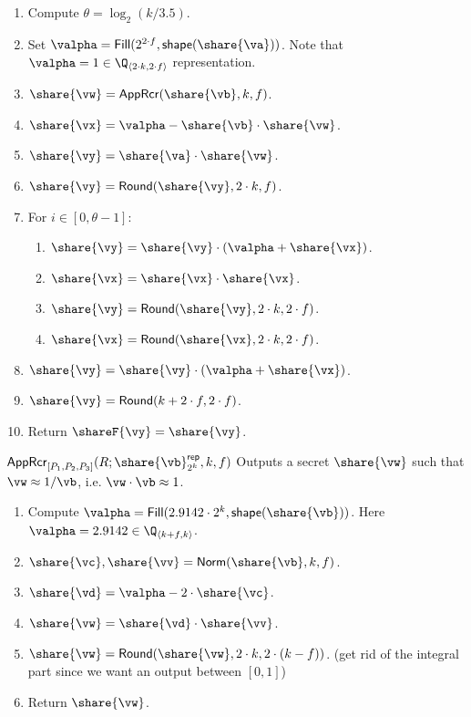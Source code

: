 \begin{enumerate}
    \item Compute $\theta = \log_2({k/3.5})$.
    \item Set $\valpha = \mathsf{Fill}(2^{2\cdot f},\mathsf{shape}(\share{\va}))$. Note that $\valpha = 1 \in \Q_{\langle 2\cdot k, 2\cdot f \rangle}$ representation.
    \item $\share{\vw} = \mathsf{AppRcr}(\share{\vb}, k, f)$.
    \item $\share{\vx} = \valpha - \share{\vb} \cdot \share{\vw}$.
    \item $\share{\vy} = \share{\va} \cdot \share{\vw}$.
    \item $\share{\vy} = \mathsf{Round}(\share{\vy}, 2\cdot k, f)$.
    \item For $i \in [0, \theta - 1]$:
  \begin{enumerate}
    \item $\share{\vy} = \share{\vy} \cdot (\valpha + \share{\vx})$.
    \item $\share{\vx} = \share{\vx} \cdot \share{\vx}$.
    \item $\share{\vy} = \mathsf{Round}(\share{\vy}, 2 \cdot k, 2 \cdot f)$.
    \item $\share{\vx} = \mathsf{Round}(\share{\vx}, 2\cdot k, 2\cdot f)$.
  \end{enumerate}
  \item $\share{\vy} = \share{\vy} \cdot (\valpha + \share{\vx})$.
  \item $\share{\vy} = \mathsf{Round}(k + 2 \cdot f, 2 \cdot f)$.
  \item Return $\shareF{\vy} = \share{\vy}$.
\end{enumerate}

\msubsubsection
  {$\mathsf{AppRcr}_{[P_1, P_2, P_3]}(R; \share{\vb}^\mathsf{rep}_{2^k}, k, f)$}
  Outputs a secret $\share{\vw}$ such that $\vw \approx 1/\vb$, i.e. $\vw \cdot \vb \approx 1$.
  \begin{enumerate}
    \item Compute $\valpha = \mathsf{Fill}(2.9142 \cdot 2^k,
    \mathsf{shape}(\share{\vb}))$. Here $\valpha = 2.9142 \in \Q_{\langle k + f,
    k\rangle}$. 
    \item $\share{\vc}, \share{\vv} = \mathsf{Norm}(\share{\vb}, k, f)$.
    \item $\share{\vd} = \valpha - 2 \cdot \share{\vc}$.
    \item $\share{\vw} = \share{\vd} \cdot \share{\vv}$.
    \item $\share{\vw} = \mathsf{Round}(\share{\vw}, 2 \cdot k, 2 \cdot (k -
    f))$. (get rid of the integral part since we want an output between $[0, 1]$) \item Return
    $\share{\vw}$.
\end{enumerate}


